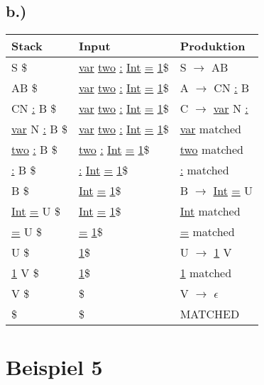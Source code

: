 \documentclass[12pt,runningheads,a4paper]{llncs}
\begin{document}
\subsection*{b.)}

\begin{table}[H]
    \centering
      \begin{tabular}{|m{2cm}|m{3cm}|m{3cm}|}
\hline
Stack & Input & Produktion \\ \hline
S \$& \underline{var} \underline{two} \underline{:}  \underline{Int} \underline{=} \underline{1}\$& S $\rightarrow$ AB  \\ \hline
AB \$& \underline{var} \underline{two} \underline{:}  \underline{Int} \underline{=} \underline{1}\$& A $\rightarrow$ CN \underline{:} B  \\ \hline
CN \underline{:} B \$& \underline{var} \underline{two} \underline{:}  \underline{Int} \underline{=} \underline{1}\$&C $\rightarrow$ \underline{var} N \underline{:} \\ \hline
\underline{var} N \underline{:} B \$& \underline{var} \underline{two} \underline{:}  \underline{Int} \underline{=} \underline{1}\$& \underline{var} matched\\ \hline
\underline{two} \underline{:} B \$& \underline{two} \underline{:}  \underline{Int} \underline{=} \underline{1}\$&\underline{two} matched\\ \hline
\underline{:} B \$& \underline{:}  \underline{Int} \underline{=} \underline{1}\$&\underline{:} matched\\ \hline
B \$& \underline{Int} \underline{=} \underline{1}\$& B $\rightarrow$ \underline{Int} \underline{=} U\\ \hline
\underline{Int} \underline{=} U \$& \underline{Int} \underline{=} \underline{1}\$&\underline{Int}  matched\\ \hline
\underline{=} U \$& \underline{=} \underline{1}\$&\underline{=} matched\\ \hline
U \$&\underline{1}\$& U $\rightarrow$ \underline{1} V\\ \hline
\underline{1} V \$&\underline{1}\$& \underline{1} matched\\ \hline
V \$&\$&V $\rightarrow$ $\epsilon$ \\ \hline
\$ & \$ & MATCHED\\

\hline
        \end{tabular}
\end{table}


\section*{Beispiel 5}
\end{document}
